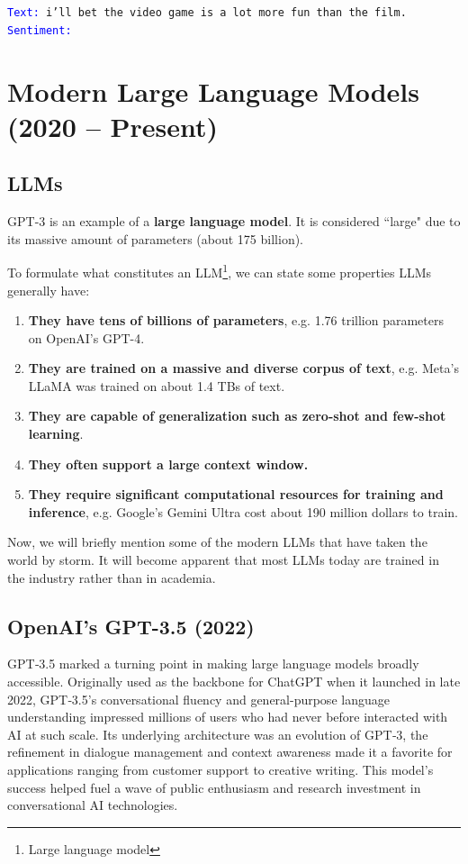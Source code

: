 \documentclass[11pt,twoside]{article}
\begin{document}
\texttt{\textcolor{blue}{Text:} i'll bet the video game is a lot more fun than the film. \\
\textcolor{blue}{Sentiment:}
}

\hrulefill

\section{Modern Large Language Models (2020 -- Present)}
\subsection{LLMs}
GPT-3 is an example of a \textbf{large language model}. It is considered ``large" due to its massive amount of parameters (about 175 billion).

To formulate what constitutes an LLM\footnote{Large language model}, we can state some properties LLMs generally have:
\begin{enumerate}
    \item \textbf{They have tens of billions of parameters}, e.g. 1.76 trillion parameters on OpenAI's GPT-4.
    \item \textbf{They are trained on a massive and diverse corpus of text}, e.g. Meta's LLaMA was trained on about 1.4 TBs of text.
    \item  \textbf{They are capable of generalization such as zero-shot and few-shot learning}.
    \item \textbf{They often support a large context window.}
    \item  \textbf{They require significant computational resources for training and inference}, e.g. Google's Gemini Ultra cost about 190 million dollars to train.
\end{enumerate}

Now, we will briefly mention some of the modern LLMs that have taken the world by storm. It will become apparent that most LLMs today are trained in the industry rather than in academia.

\subsection{OpenAI's GPT-3.5 (2022)}
GPT‑3.5 marked a turning point in making large language models broadly accessible. Originally used as the backbone for ChatGPT when it launched in late 2022, GPT‑3.5’s conversational fluency and general-purpose language understanding impressed millions of users who had never before interacted with AI at such scale. Its underlying architecture was an evolution of GPT‑3, the refinement in dialogue management and context awareness made it a favorite for applications ranging from customer support to creative writing. This model’s success helped fuel a wave of public enthusiasm and research investment in conversational AI technologies.
\end{document}
